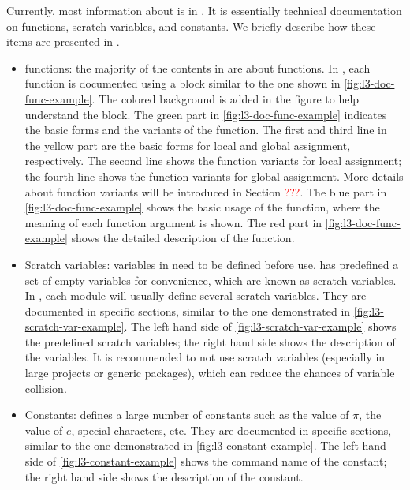 \documentclass{ltugboat}
\begin{document}
Currently, most information about \LTT{} is in \cite{l3interface}. 
It is essentially technical documentation on \LTT{} functions, scratch variables, and constants. 
We briefly describe how these items are presented in \cite{l3interface}.
\begin{itemize}
\item \LTT{} functions: the majority of the contents in \cite{l3interface} are about \LTT{} functions.
In \cite{l3interface}, each function is documented using a block similar to the one shown in  \cref{fig:l3-doc-func-example}.
The colored background is added in the figure to help understand the block.
The green part in \cref{fig:l3-doc-func-example} indicates the basic forms and the variants of the function. 
The first and third line in the yellow part are the basic forms for local and global assignment, respectively.
The second line shows the function variants for local assignment; the fourth line shows the function variants for global assignment.
More details about function variants will be introduced in Section \textcolor{red}{???}.
The blue part in \cref{fig:l3-doc-func-example} shows the basic usage of the function, where the meaning of each function argument is shown.
The red part in \cref{fig:l3-doc-func-example} shows the detailed description of the function.

\item Scratch variables: variables in \LTT{} need to be defined before use. 
\LTT{} has predefined a set of empty variables for convenience, which are known as scratch variables.
In \LTT{}, each module will usually define several scratch variables.
They are documented in specific sections, similar to the one demonstrated in \cref{fig:l3-scratch-var-example}.
The left hand side of \cref{fig:l3-scratch-var-example} shows the predefined scratch variables; the right hand side shows the description of the variables.
It is recommended to not use scratch variables (especially in large projects or generic packages), which can reduce the chances of variable collision.

\item Constants: \LTT{} defines a large number of constants such as the value of $\pi$, the value of $e$, special characters, etc. 
They are documented in specific sections, similar to the one demonstrated in \cref{fig:l3-constant-example}.
The left hand side of \cref{fig:l3-constant-example} shows the command name of the constant; the right hand side shows the description of the constant.

\end{itemize}
\end{document}

